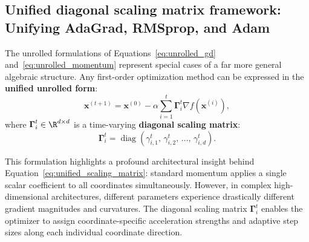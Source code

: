 \subsection{Unified diagonal scaling matrix framework: Unifying AdaGrad, RMSprop, and Adam}
\label{sec:unified_diagonal_scaling}

The unrolled formulations of Equations~\eqref{eq:unrolled_gd} and~\eqref{eq:unrolled_momentum} represent special cases of a far more general algebraic structure. Any first-order optimization method can be expressed in the \textbf{unified unrolled form}:
\begin{equation}
\mathbf{x}^{(t+1)} = \mathbf{x}^{(0)} - \alpha \sum_{i=1}^t \boldsymbol{\Gamma}_i^t \nabla f(\mathbf{x}^{(i)}),
\label{eq:unified_scaling_matrix}
\end{equation}
where $\boldsymbol{\Gamma}_i^t \in \R^{d \times d}$ is a time-varying \textbf{diagonal scaling matrix}:
\begin{equation}
\boldsymbol{\Gamma}_i^t = \operatorname{diag}\left( \gamma_{i, 1}^t, \, \gamma_{i, 2}^t, \, \dots, \, \gamma_{i, d}^t \right).
\end{equation}

This formulation highlights a profound architectural insight behind Equation~\eqref{eq:unified_scaling_matrix}: standard momentum applies a single scalar coefficient to all coordinates simultaneously. However, in complex high-dimensional architectures, different parameters experience drastically different gradient magnitudes and curvatures. The diagonal scaling matrix $\boldsymbol{\Gamma}_i^t$ enables the optimizer to assign coordinate-specific acceleration strengths and adaptive step sizes along each individual coordinate direction.

